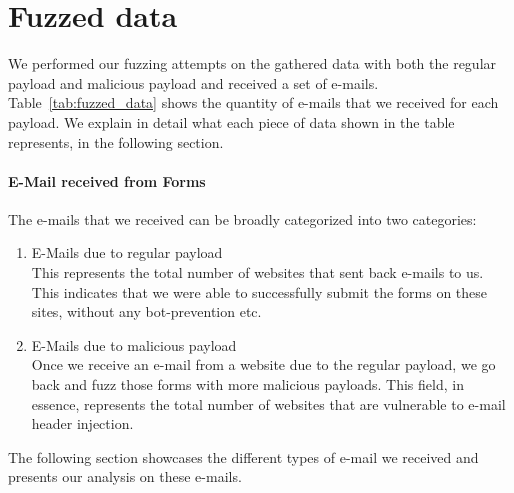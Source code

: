\section{Fuzzed data}
We performed our fuzzing attempts on the gathered data with both the regular payload and malicious payload and received a set of e-mails. Table~\ref{tab:fuzzed_data} shows the quantity of e-mails that we received for each payload. We explain in detail what each piece of data shown in the table represents, in the following section.

\paragraph{E-Mail received from Forms}
The e-mails that we received can be broadly categorized into two categories:
\begin{enumerate}
	\item E-Mails due to regular payload\\
	This represents the total number of websites that sent back e-mails to us. This indicates that we were able to successfully submit the forms on these sites, without any bot-prevention etc.
	\item E-Mails due to malicious payload\\
    Once we receive an e-mail from a website due to the regular payload, we go back and fuzz those forms with more malicious payloads. This field, in essence, represents the total number of websites that are vulnerable to e-mail header injection.
\end{enumerate}
The following section showcases the different types of e-mail we received and presents our analysis on these e-mails.



